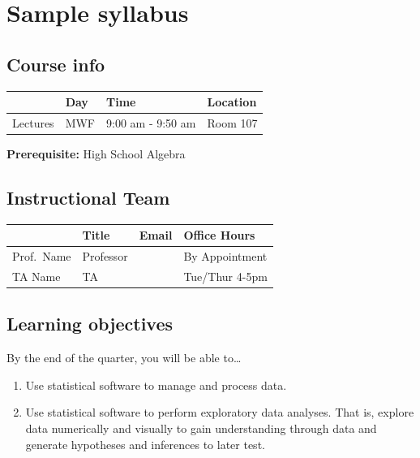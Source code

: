 \documentclass[
  letterpaper,
  DIV=11,
  numbers=noendperiod]{scrreprt}
\providecommand{\tightlist}{%
  \setlength{\itemsep}{0pt}\setlength{\parskip}{0pt}}\usepackage{longtable,booktabs,array}
\begin{document}

\hypertarget{sample-syllabus}{%
\chapter*{Sample syllabus}\label{sample-syllabus}}

\hypertarget{course-info}{%
\section*{Course info}\label{course-info}}

\begin{longtable}[]{@{}llll@{}}
\toprule()
& Day & Time & Location \\
\midrule()
\endhead
Lectures & MWF & 9:00 am - 9:50 am & Room 107 \\
\bottomrule()
\end{longtable}

\textbf{Prerequisite:} High School Algebra

\hypertarget{instructional-team}{%
\section*{Instructional Team}\label{instructional-team}}

\begin{longtable}[]{@{}llll@{}}
\toprule()
& Title & Email & Office Hours \\
\midrule()
\endhead
Prof.~Name & Professor & & By Appointment \\
TA Name & TA & & Tue/Thur 4-5pm \\
\bottomrule()
\end{longtable}

\hypertarget{learning-objectives}{%
\section*{Learning objectives}\label{learning-objectives}}

By the end of the quarter, you will be able to\ldots{}

\begin{enumerate}
\def\labelenumi{\arabic{enumi}.}
\tightlist
\item
  Use statistical software to manage and process data.
\item
  Use statistical software to perform exploratory data analyses. That
  is, explore data numerically and visually to gain understanding
  through data and generate hypotheses and inferences to later test.
\end{enumerate}
\end{document}

